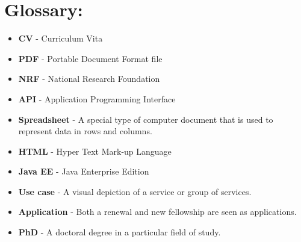 \documentclass[12pt]{article}
\begin{document}
\vspace{0.5in}

\newpage
\section{Glossary:} %
\vspace{0.2in}

\begin{itemize}


\item \textbf{CV} - Curriculum Vita
\item \textbf{PDF} - Portable Document Format file
\item \textbf{NRF} - National Research Foundation
\item \textbf{API} - Application Programming Interface
\item \textbf{Spreadsheet} - A special type of computer document that is used to represent data in rows and columns. 
\item \textbf{HTML} - Hyper Text Mark-up Language
\item \textbf{Java EE} - Java Enterprise Edition
\item \textbf{Use case} - A visual depiction of a service or group of services.
\item \textbf{Application} - Both a renewal and new fellowship are seen as applications.
\item \textbf{PhD} - A doctoral degree in a particular field of study. 


\end{itemize}	


\vspace{0.5in}
\end{document}
